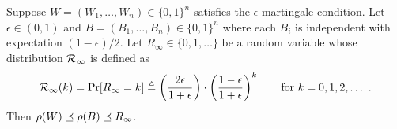 
\begin{lemma}\label{lemma:rho-stationary}
  Suppose $W = (W_1, \ldots, W_n) \in \{0,1\}^n$ satisfies the 
  $\epsilon$-martingale condition. 
  Let $\epsilon \in (0, 1)$ and $B = (B_1, \ldots, B_n) \in \{0,1\}^n$ 
  where each $B_i$ is independent with expectation $(1- \epsilon)/2$.
  Let $R_\infty \in \{0, 1, \ldots\}$ be a random variable 
  whose distribution $\mathcal{R}_\infty$ is defined as 
    \begin{equation}
      \label{eq:stationary}
      \StationaryRho(k) 
        = \Pr[R_\infty = k] 
        \defeq \left(\frac{2\epsilon}{1+\epsilon}\right)\cdot \left(\frac{1-\epsilon}{1 + \epsilon}\right)^k
        \qquad \text{for $k = 0, 1, 2, \ldots$}\ 
      \,.
    \end{equation}
  Then $\rho(W) \preceq \rho(B) \preceq R_\infty$.
\end{lemma}

